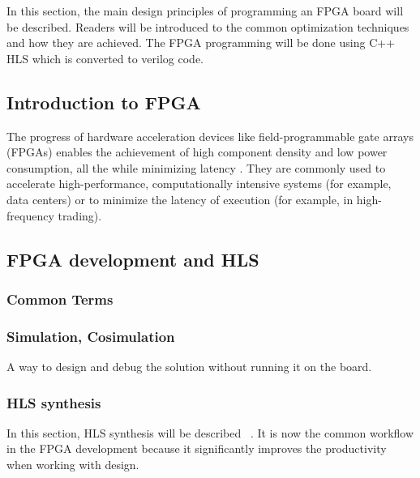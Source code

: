 \documentclass[a4paper, twoside]{report}
\theoremstyle{definition}
\numberwithin{equation}{section}
\begin{document}
In this section, the main design principles of programming an FPGA board will be described. Readers will be introduced to the common optimization techniques and how they are achieved. The FPGA programming will be done using C++ HLS which is converted to verilog code.

\subsection{Introduction to FPGA}


The progress of hardware acceleration devices like field-programmable gate arrays (FPGAs) enables the achievement of high component density and low power consumption, all the while minimizing latency \cite{10.1007/978-3-319-56258-2_14}. They are commonly used to accelerate high-performance, computationally intensive systems (for example, data centers) or to minimize the latency of execution (for example, in high-frequency trading).

\subsection{FPGA development and HLS}

\subsubsection{Common Terms}



\subsubsection{Simulation, Cosimulation}

A way to design and debug the solution without running it on the board.

\subsubsection{HLS synthesis}

In this section, HLS synthesis will be described ~\cite{AMD2023VitisHLS}. It is now the common workflow in the FPGA development because it significantly improves the productivity when working with design.
\end{document}
